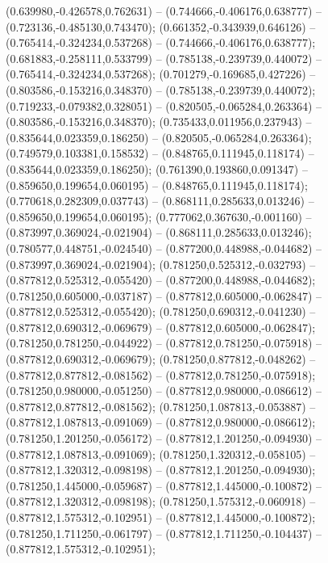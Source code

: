  (0.639980,-0.426578,0.762631) -- (0.744666,-0.406176,0.638777) -- (0.723136,-0.485130,0.743470);
 (0.661352,-0.343939,0.646126) -- (0.765414,-0.324234,0.537268) -- (0.744666,-0.406176,0.638777);
 (0.681883,-0.258111,0.533799) -- (0.785138,-0.239739,0.440072) -- (0.765414,-0.324234,0.537268);
 (0.701279,-0.169685,0.427226) -- (0.803586,-0.153216,0.348370) -- (0.785138,-0.239739,0.440072);
 (0.719233,-0.079382,0.328051) -- (0.820505,-0.065284,0.263364) -- (0.803586,-0.153216,0.348370);
 (0.735433,0.011956,0.237943) -- (0.835644,0.023359,0.186250) -- (0.820505,-0.065284,0.263364);
 (0.749579,0.103381,0.158532) -- (0.848765,0.111945,0.118174) -- (0.835644,0.023359,0.186250);
 (0.761390,0.193860,0.091347) -- (0.859650,0.199654,0.060195) -- (0.848765,0.111945,0.118174);
 (0.770618,0.282309,0.037743) -- (0.868111,0.285633,0.013246) -- (0.859650,0.199654,0.060195);
 (0.777062,0.367630,-0.001160) -- (0.873997,0.369024,-0.021904) -- (0.868111,0.285633,0.013246);
 (0.780577,0.448751,-0.024540) -- (0.877200,0.448988,-0.044682) -- (0.873997,0.369024,-0.021904);
 (0.781250,0.525312,-0.032793) -- (0.877812,0.525312,-0.055420) -- (0.877200,0.448988,-0.044682);
 (0.781250,0.605000,-0.037187) -- (0.877812,0.605000,-0.062847) -- (0.877812,0.525312,-0.055420);
 (0.781250,0.690312,-0.041230) -- (0.877812,0.690312,-0.069679) -- (0.877812,0.605000,-0.062847);
 (0.781250,0.781250,-0.044922) -- (0.877812,0.781250,-0.075918) -- (0.877812,0.690312,-0.069679);
 (0.781250,0.877812,-0.048262) -- (0.877812,0.877812,-0.081562) -- (0.877812,0.781250,-0.075918);
 (0.781250,0.980000,-0.051250) -- (0.877812,0.980000,-0.086612) -- (0.877812,0.877812,-0.081562);
 (0.781250,1.087813,-0.053887) -- (0.877812,1.087813,-0.091069) -- (0.877812,0.980000,-0.086612);
 (0.781250,1.201250,-0.056172) -- (0.877812,1.201250,-0.094930) -- (0.877812,1.087813,-0.091069);
 (0.781250,1.320312,-0.058105) -- (0.877812,1.320312,-0.098198) -- (0.877812,1.201250,-0.094930);
 (0.781250,1.445000,-0.059687) -- (0.877812,1.445000,-0.100872) -- (0.877812,1.320312,-0.098198);
 (0.781250,1.575312,-0.060918) -- (0.877812,1.575312,-0.102951) -- (0.877812,1.445000,-0.100872);
 (0.781250,1.711250,-0.061797) -- (0.877812,1.711250,-0.104437) -- (0.877812,1.575312,-0.102951);
